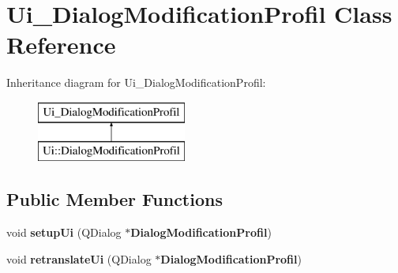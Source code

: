 \section{Ui\-\_\-\-Dialog\-Modification\-Profil Class Reference}
\label{class_ui___dialog_modification_profil}
Inheritance diagram for Ui\-\_\-\-Dialog\-Modification\-Profil\-:\begin{figure}[H]
\begin{center}
\leavevmode
\includegraphics[height=2.000000cm]{class_ui___dialog_modification_profil}
\end{center}
\end{figure}
\subsection*{Public Member Functions}
\begin{DoxyCompactItemize}
\item 
void {\bfseries setup\-Ui} (Q\-Dialog $\ast${\bf Dialog\-Modification\-Profil})\label{class_ui___dialog_modification_profil_a48769dc430bb027d7b0b6df4bcd7146b}

\item 
void {\bfseries retranslate\-Ui} (Q\-Dialog $\ast${\bf Dialog\-Modification\-Profil})\label{class_ui___dialog_modification_profil_aaa740d7d565aabc709ec9b4e5ca46568}

\end{DoxyCompactItemize}
